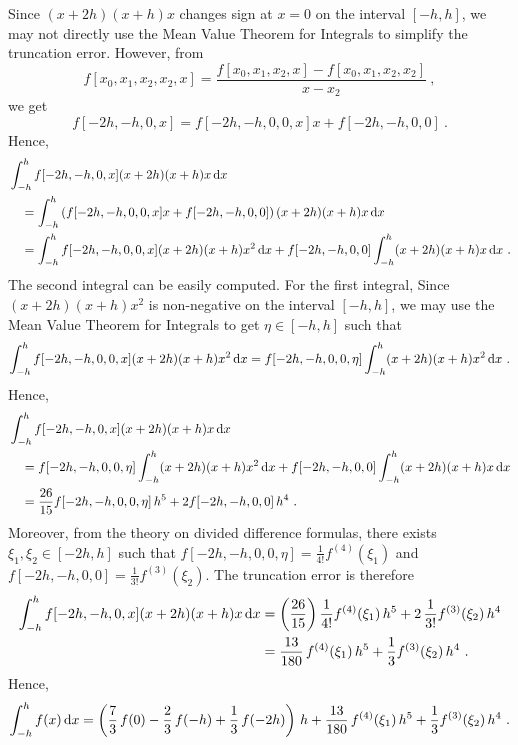 {Since $(x+2h)(x+h)x$ changes sign at $x=0$ on the interval $[-h,h]$, we
may not directly use the Mean Value Theorem for Integrals to simplify
the truncation error.  However, from
\[
f[x_0,x_1,x_2,x_2,x] = \frac{f[x_0,x_1,x_2,x] - f[x_0,x_1,x_2,x_2]}{x-x_2} \ ,
\]
we get
\[
f[-2h,-h,0,x] = f[-2h,-h,0,0,x] x + f[-2h,-h,0,0] \ .
\]
Hence,
\begin{align*}
&\int_{-h}^h f[-2h,-h,0,x] (x+2h)(x+h)x \,\mathrm{d}x \\
&\quad = \int_{-h}^h
\left( f[-2h,-h,0,0,x] x + f[-2h,-h,0,0] \right)
(x+2h)(x+h)x \,\mathrm{d}x \\
&\quad = \int_{-h}^h f[-2h,-h,0,0,x] (x+2h)(x+h)x^2 \,\mathrm{d}x
+f[-2h,-h,0,0] \int_{-h}^h (x+2h)(x+h)x \,\mathrm{d}x \ .
\end{align*}
The second integral can be easily computed.  For the first integral,
Since $(x+2h)(x+h)x^2$ is non-negative on the interval $[-h,h]$, we may
use the Mean Value Theorem for Integrals to get $\eta \in [-h,h]$ such
that
\[
\int_{-h}^h f[-2h,-h,0,0,x] (x+2h)(x+h)x^2 \,\mathrm{d}x
= f[-2h,-h,0,0,\eta] \int_{-h}^h(x+2h)(x+h)x^2 \,\mathrm{d}x \ .
\]
Hence,
\begin{align*}
&\int_{-h}^h f[-2h,-h,0,x] (x+2h)(x+h)x \,\mathrm{d}x \\
&\quad = f[-2h,-h,0,0,\eta] \int_{-h}^h (x+2h)(x+h)x^2 \,\mathrm{d}x
 + f[-2h,-h,0,0] \int_{-h}^h (x+2h)(x+h)x \,\mathrm{d}x \\
&\quad = \frac{26}{15} f[-2h,-h,0,0,\eta]\,h^5 + 2 f[-2h,-h,0,0]\,h^4 \ .
\end{align*}
Moreover, from the theory on divided difference formulas, there exists
$\xi_1, \xi_2 \in [-2h,h]$ such that
$\displaystyle f[-2h,-h,0,0,\eta] = \frac{1}{4!} f^{(4)}(\xi_1)$
and
$\displaystyle f[-2h,-h,0,0] = \frac{1}{3!} f^{(3)}(\xi_2)$.
The truncation error is therefore
\begin{align*}
\int_{-h}^h f[-2h,-h,0,x] (x+2h)(x+h)x \,\mathrm{d}x 
&= \left(\frac{26}{15}\right) \frac{1}{4!} f^{(4)}(\xi_1)\, h^5
+ 2 \,\frac{1}{3!} f^{(3)}(\xi_2)\, h^4 \\
&= \frac{13}{180} \, f^{(4)}(\xi_1)\,h^5 + \frac{1}{3} f^{(3)}(\xi_2)\,h^4 \ .
\end{align*}
Hence,
\begin{equation}\label{Questformula1}
\int_{-h}^h f(x) \,\mathrm{d}x
= \left(\frac{7}{3}\,f(0) - \frac{2}{3}\,f(-h) +
\frac{1}{3}\,f(-2h)\right)\,h
+ \frac{13}{180} \, f^{(4)}(\xi_1)\,h^5 + \frac{1}{3} f^{(3)}(\xi_2)\,h^4 \ .
\end{equation}

}
